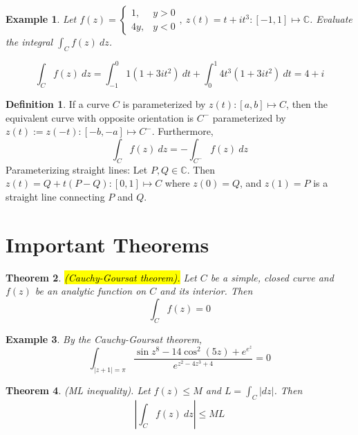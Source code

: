 \documentclass{article}
\newtheorem{theorem}{Theorem}[section]
\newtheorem{example}[theorem]{Example}
\theoremstyle{definition}
\newtheorem{definition}{Definition}[section]
\begin{document}
\begin{example} \normalfont
    Let $f(z) = \begin{cases}
        1, & y > 0 \\ 4y, & y < 0
    \end{cases},\ z(t) = t + it^3: [-1, 1] \mapsto \mathbb{C}$. Evaluate the integral $\int_C f(z)\ dz$.

    \begin{equation*}
        \int_C f(z)\ dz = \int_{-1}^0 1(1+3it^2)\ dt + \int_0^1 4t^3 (1+3it^2)\ dt = 4+i
    \end{equation*}
\end{example}

\begin{definition}
    If a curve $C$ is parameterized by $z(t): [a, b] \mapsto C$, then the equivalent curve with opposite orientation is $C^-$ parameterized by $z(t) := z(-t): [-b, -a] \mapsto C^-$. Furthermore,
    \begin{equation*}
        \int_C f(z)\ dz = -\int_{C^-} f(z)\ dz
    \end{equation*}
    Parameterizing straight lines: Let $P, Q \in \mathbb{C}$. Then $z(t) = Q + t(P-Q): [0, 1] \mapsto C$ where $z(0) = Q$, and $z(1) = P$ is a straight line connecting $P$ and $Q$.
\end{definition}


\section{Important Theorems}

\begin{theorem}
    \hl{(Cauchy-Goursat theorem).} Let $C$ be a simple, closed curve and $f(z)$ be an analytic function on $C$ and its interior. Then
    \begin{equation*}
        \int_C f(z) = 0
    \end{equation*}
\end{theorem}

\begin{example} \normalfont
    By the Cauchy-Goursat theorem,
    \begin{equation*}
        \int_{|z+1| = \pi} \frac{\sin z^8 - 14 \cos^2 (5z) + e^{e^z}}{e^{z^2-4z^3+4}} = 0
    \end{equation*}
\end{example}

\begin{theorem}
    (ML inequality). Let $f(z) \leq M$ and $L = \int_C |dz|$. Then
    \begin{equation*}
        \left| \int_C f(z)\ dz \right| \leq ML
    \end{equation*}
\end{theorem}
\end{document}

